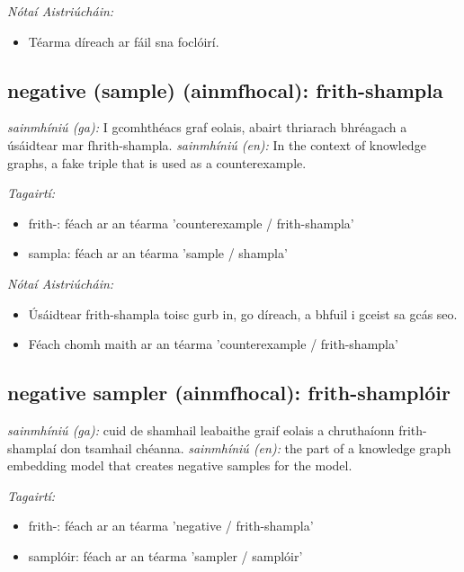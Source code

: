 \documentclass{article}
\begin{document}
 \noindent \textit{Nótaí Aistriúcháin:}
\begin{itemize}
	\item Téarma díreach ar fáil sna foclóirí.
\end{itemize}


\subsection*{negative (sample) (ainmfhocal): frith-shampla} 
 \noindent \textit{sainmhíniú (ga):} I gcomhthéacs graf eolais, abairt thriarach bhréagach a úsáidtear mar fhrith-shampla.
\newline\newline
 \noindent \textit{sainmhíniú (en):} In the context of knowledge graphs, a fake triple that is used as a counterexample.
\newline

 \noindent \textit{Tagairtí:}
\begin{itemize}
	\item frith-: féach ar an téarma 'counterexample / frith-shampla'
	\item sampla: féach ar an téarma 'sample / shampla'
\end{itemize}

 \noindent \textit{Nótaí Aistriúcháin:}
\begin{itemize}
	\item Úsáidtear frith-shampla toisc gurb in, go díreach, a bhfuil i gceist sa gcás seo.
	\item Féach chomh maith ar an téarma 'counterexample / frith-shampla'
\end{itemize}


\subsection*{negative sampler (ainmfhocal): frith-shamplóir} 
 \noindent \textit{sainmhíniú (ga):} cuid de shamhail leabaithe graif eolais a chruthaíonn frith-shamplaí don tsamhail chéanna.
\newline\newline
 \noindent \textit{sainmhíniú (en):} the part of a knowledge graph embedding model that creates negative samples for the model.
\newline

 \noindent \textit{Tagairtí:}
\begin{itemize}
	\item frith-: féach ar an téarma 'negative / frith-shampla'
	\item samplóir: féach ar an téarma 'sampler / samplóir'
\end{itemize}
\end{document}
